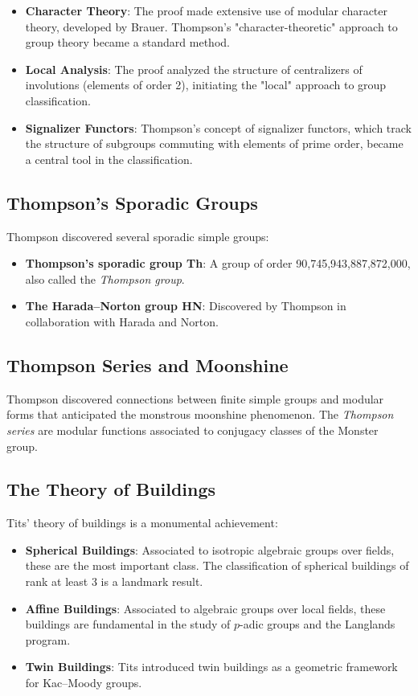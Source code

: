 \begin{itemize}
\item \textbf{Character Theory}: The proof made extensive use of modular character theory, developed by Brauer. Thompson's "character-theoretic" approach to group theory became a standard method.

\item \textbf{Local Analysis}: The proof analyzed the structure of centralizers of involutions (elements of order 2), initiating the "local" approach to group classification.

\item \textbf{Signalizer Functors}: Thompson's concept of signalizer functors, which track the structure of subgroups commuting with elements of prime order, became a central tool in the classification.
\end{itemize}

\subsection{Thompson's Sporadic Groups}

Thompson discovered several sporadic simple groups:
\begin{itemize}
\item \textbf{Thompson's sporadic group Th}: A group of order 90,745,943,887,872,000, also called the \emph{Thompson group}.
\item \textbf{The Harada--Norton group HN}: Discovered by Thompson in collaboration with Harada and Norton.
\end{itemize}

\subsection{Thompson Series and Moonshine}

Thompson discovered connections between finite simple groups and modular forms that anticipated the monstrous moonshine phenomenon. The \emph{Thompson series} are modular functions associated to conjugacy classes of the Monster group.

\subsection{The Theory of Buildings}

Tits' theory of buildings is a monumental achievement:

\begin{itemize}
\item \textbf{Spherical Buildings}: Associated to isotropic algebraic groups over fields, these are the most important class. The classification of spherical buildings of rank at least 3 is a landmark result.

\item \textbf{Affine Buildings}: Associated to algebraic groups over local fields, these buildings are fundamental in the study of $p$-adic groups and the Langlands program.

\item \textbf{Twin Buildings}: Tits introduced twin buildings as a geometric framework for Kac--Moody groups.
\end{itemize}


